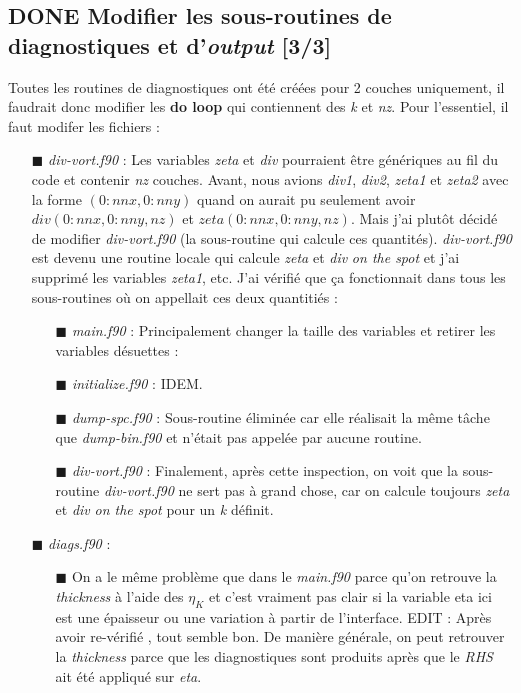 \documentclass[10pt]{article}
\numberwithin{equation}{section}
\renewcommand{\boxtimes}{\blacksquare}
\begin{document}
\subsection{{\bfseries\sffamily DONE} Modifier les sous-routines de diagnostiques et d'\emph{output} [3/3]}
\label{sec:org3ff44e3}
Toutes les routines de diagnostiques ont été créées pour 2 couches uniquement, il faudrait donc modifier les \textbf{do loop} qui contiennent des \emph{k} et \emph{nz}.
Pour l'essentiel, il faut modifer les fichiers : 

\begin{itemize}
\item[{$\boxtimes$}] \emph{div-vort.f90} : Les variables \emph{zeta} et \emph{div} pourraient être génériques au fil du code et contenir \emph{nz} couches. Avant, nous avions \emph{div1}, \emph{div2}, \emph{zeta1} et \emph{zeta2} avec la forme \((0:nnx,0:nny)\) quand on aurait pu seulement avoir \(div(0:nnx,0:nny,nz)\) et \(zeta(0:nnx,0:nny,nz)\). Mais j'ai plutôt décidé de modifier \emph{div-vort.f90} (la sous-routine qui calcule ces quantités). \emph{div-vort.f90} est devenu une routine locale qui calcule \emph{zeta} et \emph{div} \emph{on the spot} et j'ai supprimé les variables \emph{zeta1}, etc. J'ai vérifié que ça fonctionnait dans tous les sous-routines où on appellait ces deux quantitiés : 
\begin{itemize}
\item[{$\boxtimes$}] \emph{main.f90} : Principalement changer la taille des variables et retirer les variables désuettes :
\item[{$\boxtimes$}] \emph{initialize.f90} : IDEM.
\item[{$\boxtimes$}] \emph{dump-spc.f90} : Sous-routine éliminée car elle réalisait la même tâche que \emph{dump-bin.f90} et n'était pas appelée par aucune routine.
\item[{$\boxtimes$}] \emph{div-vort.f90} : Finalement, après cette inspection, on voit que la sous-routine \emph{div-vort.f90} ne sert pas à grand chose, car on calcule toujours \emph{zeta} et \emph{div} \emph{on the spot} pour un \emph{k} définit.
\end{itemize}
\item[{$\boxtimes$}] \emph{diags.f90} : 
\begin{itemize}
\item[{$\boxtimes$}] On a le même problème que dans le \emph{main.f90} parce qu'on retrouve la \emph{thickness} à l'aide des \(\eta_K\) et c'est vraiment pas clair si la variable eta ici est une épaisseur ou une variation à partir de l'interface. EDIT : Après avoir re-vérifié , tout semble bon. De manière générale, on peut retrouver la \emph{thickness} parce que les diagnostiques sont produits après que le \emph{RHS} ait été appliqué sur \emph{eta}.

\end{itemize}
\end{itemize}
\end{document}
